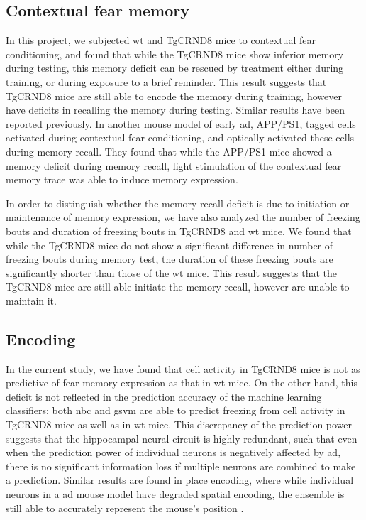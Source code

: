 \subsection{Contextual fear memory}

In this project, we subjected \gls{wt} and TgCRND8 mice to contextual fear conditioning, and found that while the TgCRND8 mice show inferior memory during testing, this memory deficit can be rescued by \tglu{} treatment either during training, or during exposure to a brief reminder. This result suggests that TgCRND8 mice are still able to encode the memory during training, however have deficits in recalling the memory during testing. Similar results have been reported previously. In another mouse model of early \gls{ad}, APP/PS1, \citet{roy16} tagged cells activated during contextual fear conditioning, and optically activated these cells during memory recall. They found that while the APP/PS1 mice showed a memory deficit during memory recall, light stimulation of the contextual fear memory trace was able to induce memory expression. 

In order to distinguish whether the memory recall deficit is due to initiation or maintenance of memory expression, we have also analyzed the number of freezing bouts and duration of freezing bouts in TgCRND8 and \gls{wt} mice. We found that while the TgCRND8 mice do not show a significant difference in number of freezing bouts during memory test, the duration of these freezing bouts are significantly shorter than those of the \gls{wt} mice. This result suggests that the TgCRND8 mice are still able initiate the memory recall, however are unable to maintain it. 

\subsection{Encoding}

In the current study, we have found that cell activity in TgCRND8 mice is not as predictive of fear memory expression as that in \gls{wt} mice. On the other hand, this deficit is not reflected in the prediction accuracy of the machine learning classifiers: both \gls{nbc} and \gls{gsvm} are able to predict freezing from cell activity in TgCRND8 mice as well as in \gls{wt} mice. This discrepancy of the prediction power suggests that the hippocampal neural circuit is highly redundant, such that even when the prediction power of individual neurons is negatively affected by \gls{ad}, there is no significant information loss if multiple neurons are combined to make a prediction. Similar results are found in place encoding, where while individual neurons in a \gls{ad} mouse model have degraded spatial encoding, the ensemble is still able to accurately represent the mouse's position \citep{cheng13}.  

